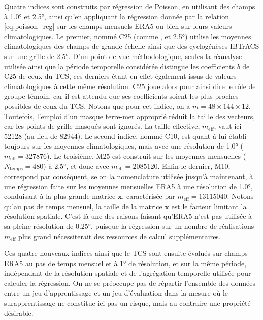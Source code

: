 \documentclass[../main.tex]{subfiles}
\begin{document}
Quatre indices sont construits par régression de Poisson, en utilisant des champs à \ang{1.0} et \ang{2.5}, ainsi qu'en appliquant la régression donnée par la
relation \ref{eq:poisson_reg} sur les champs mensuels ERA5 ou bien sur leurs valeurs climatologiques. Le premier, nommé C25 (comme , et
\ang{2.5}) utilise les moyennes climatologiques des champs de grande échelle ainsi que des cyclogénèses IBTrACS sur une grille de \ang{2.5}. D'un point de vue
méthodologique, seules la réanalyse utilisée ainsi que la période temporelle considérée distingue les coefficients $b$ de C25 de ceux du TCS, ces derniers étant
en effet également issus de valeurs climatologiques à cette même résolution. C25 joue alors pour ainsi dire le rôle de groupe témoin, car il est attendu que ses
coefficients soient les plus proches possibles de ceux du TCS. Notons que pour cet indice, on a $m = \num{48} \times \num{144} \times \num{12}$. Toutefois,
l'emploi d'un masque terre-mer approprié réduit la taille des vecteurs, car les points de grille masqués sont ignorés. La taille effective, $m_{\mathrm{eff}}$,
vaut ici \num{52128} (au lieu de \num{82944}). Le second indice, nommé C10, est quant à lui établi toujours sur les moyennes climatologiques, mais avec une
résolution de \ang{1.0} ($m_{\mathrm{eff}} = \num{327876}$). Le troisième, M25 est construit sur les moyennes mensuelles ($N_{\mathrm{temps}} = \num{480}$) à
\ang{2.5}, et donc avec $m_{\mathrm{eff}} = \num{2085120}$. Enfin le dernier, M10, correspond par conséquent, selon la nomenclature utilisée jusqu'à maintenant,
à une régression faite sur les moyennes mensuelles ERA5 à une résolution de \ang{1.0}, conduisant à la plus grande matrice $\mathbf{x}$, caractérisée par
$m_{\mathrm{eff}} = \num{13115040}$. Notons qu'au pas de temps mensuel, la taille de la matrice $\mathbf{x}$ est le facteur limitant la résolution spatiale.
C'est là une des raisons faisant qu'ERA5 n'est pas utilisée à sa pleine résolution de \ang{0.25}, puisque la régression sur un nombre de réalisations
$m_{\mathrm{eff}}$ plus grand nécessiterait des ressources de calcul supplémentaires.

Ces quatre nouveaux indices ainsi que le TCS sont ensuite évalués sur champs ERA5 au pas de temps mensuel et à \ang{1} de résolution, et sur la même période,
indépendant de la résolution spatiale et de l'agrégation temporelle utilisée pour calculer la régression. On ne se préoccupe pas de répartir l'ensemble des
données entre un jeu d'apprentissage et un jeu d'évaluation dans la mesure où le surapprentissage ne constitue ici pas un risque, mais au contraire une
propriété désirable.
\end{document}

